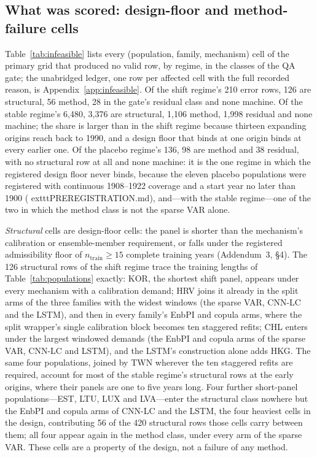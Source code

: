 \subsection{What was scored: design-floor and method-failure cells}
\label{sec:results-infeasible}


Table~\ref{tab:infeasible} lists every (population, family, mechanism) cell
of the primary grid that produced no valid row, by regime, in the classes
of the QA gate; the unabridged ledger, one row per affected cell with the
full recorded reason, is Appendix~\ref{app:infeasible}. Of the shift
regime's 210 error rows, 126 are structural, 56 method, 28 in the gate's
residual class and none machine. Of the stable regime's 6{,}480, 3{,}376
are structural, 1{,}106 method, 1{,}998 residual and none machine; the
share is larger than in the shift regime because thirteen expanding
origins reach back to 1990, and a design floor that binds at one origin
binds at every earlier one. Of the placebo regime's 136, 98 are method and
38 residual, with no structural row at all and none machine: it is the one
regime in which the registered design floor never binds, because the
eleven placebo populations were registered with continuous 1908--1922
coverage and a start year no later than 1900
(	exttt{PREREGISTRATION.md}), and---with the stable regime---one of the two in which
the method class is not the sparse VAR alone.

\emph{Structural} cells are design-floor cells: the panel is shorter than
the mechanism's calibration or ensemble-member requirement, or falls under
the registered admissibility floor of $n_{\text{train}}\ge 15$ complete
training years (Addendum~3, \S4). The 126 structural rows of the shift
regime trace the training lengths of Table~\ref{tab:populations} exactly:
KOR, the shortest shift panel, appears under every mechanism with a
calibration demand; HRV joins it already in the split arms of the three
families with the widest windows (the sparse VAR, CNN-LC and the LSTM),
and then in every family's EnbPI and copula arms, where the split
wrapper's single calibration block becomes ten staggered refits; CHL
enters under the largest windowed demands (the EnbPI and copula arms of
the sparse VAR, CNN-LC and LSTM), and the LSTM's construction alone adds
HKG. The same four populations, joined by TWN wherever the ten staggered
refits are required, account for most of the stable regime's structural
rows at the early origins, where their panels are one to five years long.
Four further short-panel populations---EST, LTU, LUX and LVA---enter the
structural class nowhere but the EnbPI and copula arms of CNN-LC and the
LSTM, the four heaviest cells in the design, contributing 56 of the 420
structural rows those cells carry between them; all four appear again in
the method class, under every arm of the sparse VAR. These cells are a property of the design, not a failure of
any method.

